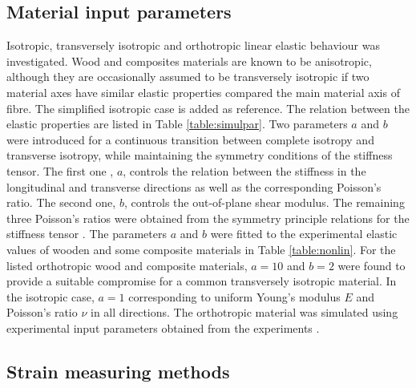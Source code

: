 \documentclass[3p]{elsarticle}
\begin{document}
\subsection{Material input parameters}

Isotropic, transversely isotropic and orthotropic
linear elastic behaviour was investigated. Wood and composites materials are known to be anisotropic, although they are occasionally assumed to be transversely isotropic if two material axes have similar elastic properties compared the main material axis of fibre. The simplified isotropic case is added as reference. 
The relation between the elastic  properties are listed in
Table \ref{table:simulpar}. Two parameters $a$ and $b$ were introduced for a continuous transition between complete isotropy and transverse isotropy, while maintaining the symmetry conditions of the stiffness tensor. 
The first one , $a$, controls the relation between the stiffness in the
longitudinal and transverse directions as well as the corresponding Poisson's ratio.
The second one, $b$, controls the out-of-plane shear modulus.  
The remaining three Poisson's ratios were obtained from the symmetry
principle relations for the stiffness tensor \cite{hyer2009stress}. The parameters $a$ and $b$ were fitted to the  experimental elastic values of wooden and some composite materials in Table \ref{table:nonlin}. For the listed orthotropic wood and composite materials, $a=10$ and $b=2$ were found to provide a suitable compromise for a common transversely isotropic material. In the isotropic case, $a=1$ corresponding to uniform Young’s modulus $E$ and Poisson’s ratio $\nu$ in all directions. 
The orthotropic material was simulated using experimental input parameters
obtained from the experiments \cite{vorobyevcharacterisation}.


\subsection{Strain measuring methods}
\end{document}
